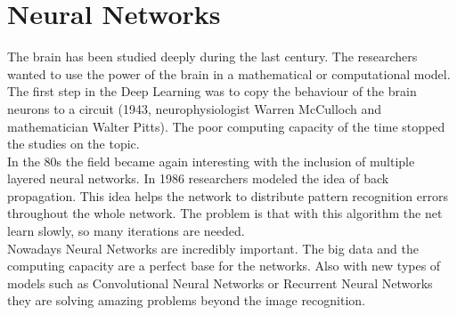 \chapter{Neural Networks}
The brain has been studied deeply during the last century. The researchers wanted to use the power of the brain in a mathematical or computational model. The first step in the Deep Learning was to copy the behaviour of the brain neurons to a circuit (1943, neurophysiologist Warren McCulloch and mathematician Walter Pitts). The poor computing capacity of the time stopped the studies on the topic.\\

In the 80s the field became again interesting with the inclusion of multiple layered neural networks. In 1986 researchers modeled the idea of back propagation. This idea helps the network to distribute pattern recognition errors throughout the whole network. The problem is that with this algorithm the net learn slowly, so many iterations are needed. \\

Nowadays Neural Networks are incredibly important. The big data and the computing capacity are a perfect base for the networks. Also with new types of models such as Convolutional Neural Networks or Recurrent Neural Networks they are solving amazing problems beyond the image recognition. \cite{hnet1} \cite{hnet2}





